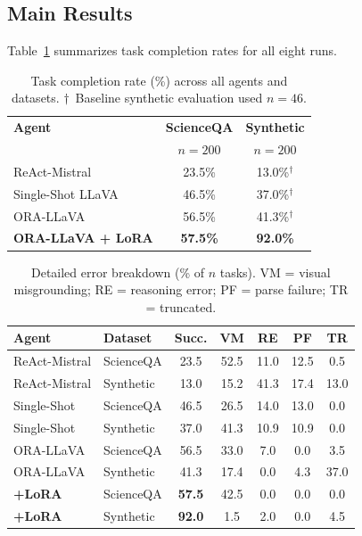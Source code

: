\documentclass[10pt,twocolumn]{article}
\begin{document}
\subsection{Main Results}

Table~\ref{tab:main} summarizes task completion rates for all eight runs.

\begin{table}[ht]
\centering
\caption{Task completion rate (\%) across all agents and datasets.
  $\dagger$~Baseline synthetic evaluation used $n{=}46$.}
\label{tab:main}
\small
\begin{tabular}{@{}lcc@{}}
\toprule
\textbf{Agent} & \textbf{ScienceQA} & \textbf{Synthetic}\\
               & $n=200$            & $n=200$\\
\midrule
ReAct-Mistral          & 23.5\%  & 13.0\%$^\dagger$\\
Single-Shot LLaVA      & 46.5\%  & 37.0\%$^\dagger$\\
ORA-LLaVA              & 56.5\%  & 41.3\%$^\dagger$\\
\midrule
\textbf{ORA-LLaVA + LoRA} & \textbf{57.5\%} & \textbf{92.0\%}\\
\bottomrule
\end{tabular}
\end{table}

\begin{table}[ht]
\centering
\caption{Detailed error breakdown (\% of $n$ tasks).
  VM = visual misgrounding; RE = reasoning error; PF = parse failure; TR = truncated.}
\label{tab:errors}
\small
\setlength{\tabcolsep}{4pt}
\begin{tabular}{@{}llccccc@{}}
\toprule
\textbf{Agent} & \textbf{Dataset} & \textbf{Succ.} & \textbf{VM} & \textbf{RE} & \textbf{PF} & \textbf{TR}\\
\midrule
ReAct-Mistral  & ScienceQA & 23.5 & 52.5 & 11.0 & 12.5 & 0.5\\
ReAct-Mistral  & Synthetic  & 13.0 & 15.2 & 41.3 & 17.4 & 13.0\\
Single-Shot    & ScienceQA & 46.5 & 26.5 & 14.0 & 13.0 & 0.0\\
Single-Shot    & Synthetic  & 37.0 & 41.3 & 10.9 & 10.9 & 0.0\\
ORA-LLaVA      & ScienceQA & 56.5 & 33.0 &  7.0 &  0.0 & 3.5\\
ORA-LLaVA      & Synthetic  & 41.3 & 17.4 &  0.0 &  4.3 & 37.0\\
\midrule
\textbf{+LoRA} & ScienceQA & \textbf{57.5} & 42.5 & 0.0 & 0.0 & 0.0\\
\textbf{+LoRA} & Synthetic  & \textbf{92.0} &  1.5 & 2.0 & 0.0 & 4.5\\
\bottomrule
\end{tabular}
\end{table}
\end{document}
